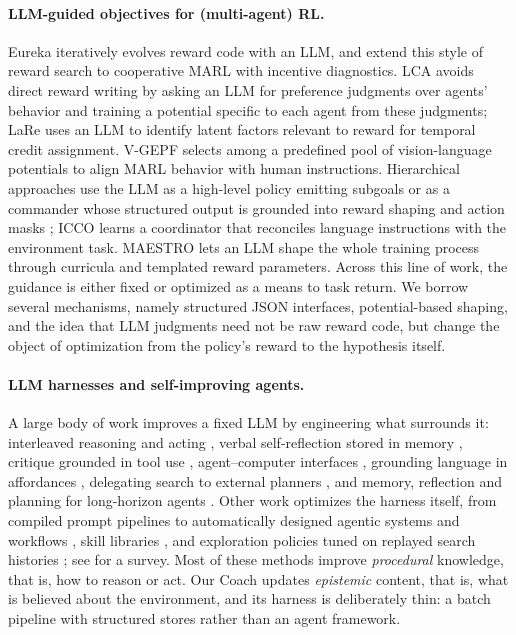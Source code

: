 \documentclass[11pt]{article}
\begin{document}
\paragraph{LLM-guided objectives for (multi-agent) RL.}
Eureka \citep{ma2024eureka} iteratively evolves reward code with an LLM, and \citet{incentive2026} extend this style of reward search to cooperative MARL with incentive diagnostics.
LCA \citep{lin2025lca} avoids direct reward writing by asking an LLM for preference judgments over agents' behavior and training a potential specific to each agent from these judgments; LaRe \citep{qu2025lare} uses an LLM to identify latent factors relevant to reward for temporal credit assignment.
V-GEPF \citep{ma2025vgepf} selects among a predefined pool of vision-language potentials to align MARL behavior with human instructions.
Hierarchical approaches use the LLM as a high-level policy emitting subgoals \citep{l2m2_2025} or as a commander whose structured output is grounded into reward shaping and action masks \citep{lehca2026}; ICCO \citep{yano2025icco} learns a coordinator that reconciles language instructions with the environment task.
MAESTRO \citep{maestro2025} lets an LLM shape the whole training process through curricula and templated reward parameters.
Across this line of work, the guidance is either fixed or optimized as a means to task return.
We borrow several mechanisms, namely structured JSON interfaces, potential-based shaping, and the idea that LLM judgments need not be raw reward code, but change the object of optimization from the policy's reward to the hypothesis itself.

\paragraph{LLM harnesses and self-improving agents.}
A large body of work improves a fixed LLM by engineering what surrounds it: interleaved reasoning and acting \citep{yao2023react}, verbal self-reflection stored in memory \citep{shinn2023reflexion}, critique grounded in tool use \citep{gou2024critic}, agent--computer interfaces \citep{yang2024sweagent}, grounding language in affordances \citep{ahn2022saycan}, delegating search to external planners \citep{liu2023llmp}, and memory, reflection and planning for long-horizon agents \citep{park2023generative}.
Other work optimizes the harness itself, from compiled prompt pipelines \citep{khattab2024dspy} to automatically designed agentic systems and workflows \citep{hu2025adas,zhang2025aflow}, skill libraries \citep{wang2023voyager}, and exploration policies tuned on replayed search histories \citep{dreamrsi2026}; see \citet{gao2026survey} for a survey.
Most of these methods improve \emph{procedural} knowledge, that is, how to reason or act.
Our Coach updates \emph{epistemic} content, that is, what is believed about the environment, and its harness is deliberately thin: a batch pipeline with structured stores rather than an agent framework.
\end{document}
